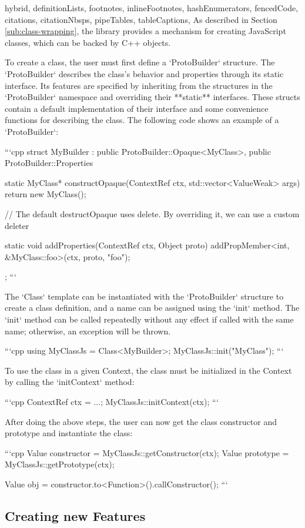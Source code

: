 \begin{markdown*}{%
  hybrid,
  definitionLists,
  footnotes,
  inlineFootnotes,
  hashEnumerators,
  fencedCode,
  citations,
  citationNbsps,
  pipeTables,
  tableCaptions,
}
As described in Section \ref{sub:class-wrapping}, the library provides a mechanism for creating JavaScript classes, which can be backed by C++ objects.

To create a class, the user must first define a `ProtoBuilder` structure. The `ProtoBuilder` describes the class's behavior and properties through its static interface. Its features are specified by inheriting from the structures in the `ProtoBuilder` namespace and overriding their **static** interfaces. These structs contain a default implementation of their interface and some convenience functions for describing the class. The following code shows an example of a `ProtoBuilder`:

```cpp
struct MyBuilder : public ProtoBuilder::Opaque<MyClass>, public ProtoBuilder::Properties {
  static MyClass* constructOpaque(ContextRef ctx, std::vector<ValueWeak> args) {
    return new MyClass();
  }

  // The default destructOpaque uses delete. By overriding it, we can use a custom deleter

  static void addProperties(ContextRef ctx, Object proto) {
    addPropMember<int, &MyClass::foo>(ctx, proto, "foo");
  }
};
```

The `Class` template can be instantiated with the `ProtoBuilder` structure to create a class definition, and a name can be assigned using the `init` method. The `init` method can be called repeatedly without any effect if called with the same name; otherwise, an exception will be thrown.

```cpp
using MyClassJs = Class<MyBuilder>;
MyClassJs::init("MyClass");
```

To use the class in a given Context, the class must be initialized in the Context by calling the `initContext` method:

```cpp
ContextRef ctx = ...;
MyClassJs::initContext(ctx);
```

After doing the above steps, the user can now get the class constructor and prototype and instantiate the class:

```cpp
Value constructor = MyClassJs::getConstructor(ctx);
Value prototype = MyClassJs::getPrototype(ctx);

Value obj = constructor.to<Function>().callConstructor();
```

\subsection{Creating new Features}


\end{markdown*}
